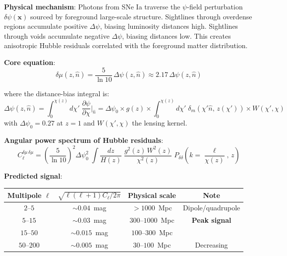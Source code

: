 \documentclass[11pt,a4paper]{article}
\newcommand{\Dpsi}{\Delta\psi}
\begin{document}
\begin{distbox}

\textbf{Physical mechanism}: Photons from SNe Ia traverse the
$\psi$-field perturbation $\delta\psi(\mathbf{x})$ sourced by
foreground large-scale structure. Sightlines through overdense
regions accumulate positive $\Dpsi$, biasing luminosity distances
high. Sightlines through voids accumulate negative $\Dpsi$, biasing
distances low. This creates anisotropic Hubble residuals correlated
with the foreground matter distribution.

\textbf{Core equation}:
\begin{equation}
\delta\mu(z, \hat{n}) = \frac{5}{\ln 10}\,\Dpsi(z, \hat{n})
\approx 2.17\,\Dpsi(z, \hat{n})
\end{equation}

where the distance-bias integral is:
\begin{equation}
\Dpsi(z, \hat{n}) = \int_0^{\chi(z)} d\chi'\;
\frac{\partial\psi}{\partial\chi}\bigg|_{\hat{n}}
= \Dpsi_0 \times g(z) \times
\int_0^{\chi(z)} d\chi'\;\delta_m(\chi'\hat{n},\,z(\chi'))
\times W(\chi',\chi)
\end{equation}
with $\Dpsi_0 = 0.27$ at $z = 1$ and $W(\chi',\chi)$ the lensing
kernel.

\textbf{Angular power spectrum of Hubble residuals}:
\begin{equation}
C_\ell^{\delta\mu\,\delta\mu} =
\left(\frac{5}{\ln 10}\right)^2 \Dpsi_0^2\;
\int \frac{dz}{H(z)}\;\frac{g^2(z)\,W^2(z)}{\chi^2(z)}\;
P_{\delta\delta}\!\left(k = \frac{\ell}{\chi(z)},\,z\right)
\end{equation}

\textbf{Predicted signal}:
\begin{center}
\begin{tabular}{cccc}
\toprule
\textbf{Multipole $\ell$} & \textbf{$\sqrt{\ell(\ell+1)C_\ell/2\pi}$}
& \textbf{Physical scale} & \textbf{Note} \\
\midrule
$2$--$5$ & $\sim 0.04$~mag & $> 1000$~Mpc & Dipole/quadrupole \\
$5$--$15$ & $\sim 0.03$~mag & $300$--$1000$~Mpc & \textbf{Peak signal} \\
$15$--$50$ & $\sim 0.015$~mag & $100$--$300$~Mpc & \\
$50$--$200$ & $\sim 0.005$~mag & $30$--$100$~Mpc & Decreasing \\
\bottomrule
\end{tabular}
\end{center}


\end{distbox}
\end{document}
